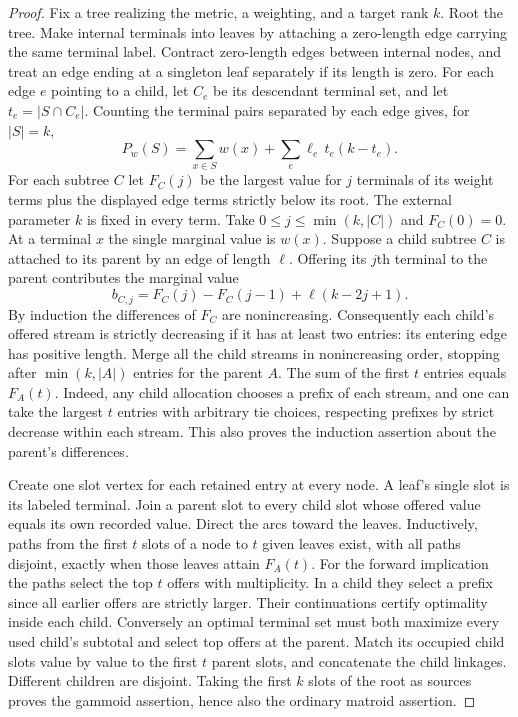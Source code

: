 \documentclass[11pt,a4paper]{article}
\begin{document}
\begin{proof}
Fix a tree realizing the metric, a weighting, and a target rank $k$. Root
the tree. Make internal terminals into leaves by attaching a zero-length
edge carrying the same terminal label. Contract zero-length edges between
internal nodes, and treat an edge ending at a singleton leaf separately
if its length is zero. For each edge $e$ pointing to a child, let $C_e$ be
its descendant terminal set, and let $t_e=|S\cap C_e|$. Counting the
terminal pairs separated by each edge gives, for $|S|=k$,
\[
 P_w(S)=\sum_{x\in S}w(x)+\sum_e \ell_e\,t_e(k-t_e).
\]
For each subtree $C$ let $F_C(j)$ be the largest value for $j$ terminals
of its weight terms plus the displayed edge terms strictly below its
root. The external parameter $k$ is fixed in every term. Take
$0\le j\le\min(k,|C|)$ and $F_C(0)=0$. At a terminal $x$ the single
marginal value is $w(x)$. Suppose a child subtree $C$ is attached to
its parent by an edge of length $\ell$. Offering its $j$th terminal to
the parent contributes the marginal value
\[
 b_{C,j}=F_C(j)-F_C(j-1)+\ell(k-2j+1).
\]
By induction the differences of $F_C$ are nonincreasing. Consequently
each child's offered stream is strictly decreasing if it has at least
two entries: its entering edge has positive length. Merge all the child
streams in nonincreasing order, stopping after $\min(k,|A|)$ entries
for the parent $A$. The sum of the first $t$ entries equals $F_A(t)$.
Indeed, any child allocation chooses a prefix of each stream, and one
can take the largest $t$ entries with arbitrary tie choices, respecting
prefixes by strict decrease within each stream. This also proves the
induction assertion about the parent's differences.

Create one slot vertex for each retained entry at every node. A leaf's
single slot is its labeled terminal. Join a parent slot to every child
slot whose offered value equals its own recorded value. Direct the arcs
toward the leaves. Inductively, paths from the first $t$ slots of a node
to $t$ given leaves exist, with all paths disjoint, exactly when those
leaves attain $F_A(t)$. For the forward implication the paths select the
top $t$ offers with multiplicity. In a child they select a prefix since
all earlier offers are strictly larger. Their continuations certify
optimality inside each child. Conversely an optimal terminal set must
both maximize every used child's subtotal and select top offers at the
parent. Match its occupied child slots value by value to the first $t$
parent slots, and concatenate the child linkages. Different children
are disjoint. Taking the first $k$ slots of the root as sources proves
the gammoid assertion, hence also the ordinary matroid assertion.


\end{proof}
\end{document}
